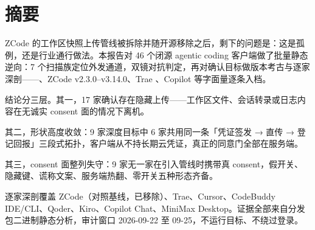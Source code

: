 \chapter*{摘要}

ZCode 的工作区快照上传管线被拆除并随开源移除之后，剩下的问题是：这是孤例，还是行业通行做法。本报告对 46 个闭源 agentic coding 客户端做了批量静态逆向：7 个扫描族定位外发通道，双镜对抗判定，再对确认目标做版本考古与逐家深剖——、ZCode v2.3.0–v3.14.0、Trae 、Copilot  等字面量逐条入档。

结论分三层。其一，17 家确认存在隐藏上传——工作区文件、会话转录或日志内容在无诚实 consent 面的情况下离机。

其二，形状高度收敛：9 家深度目标中 6 家共用同一条「凭证签发 → 直传 → 登记回报」三段式拓扑，客户端从不持长期云凭证，真正的同意门全部在服务端。

其三，consent 面整列失守：9 家无一家在引入管线时携带真 consent，假开关、隐藏键、谎称文案、服务端热翻、零开关五种形态齐备。

逐家深剖覆盖 ZCode（对照基线，已移除）、Trae、Cursor、CodeBuddy IDE/CLI、Qoder、Kiro、Copilot Chat、MiniMax Desktop。证据全部来自分发包二进制静态分析，审计窗口 2026-09-22 至 09-25，不运行目标、不绕过登录。
